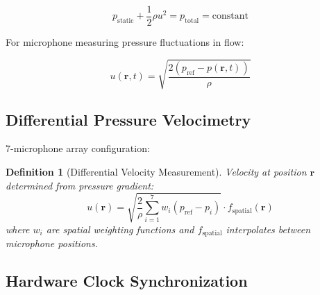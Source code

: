 \documentclass[12pt,a4paper]{article}
\newtheorem{definition}{Definition}
\begin{document}
\begin{equation}
p_{\text{static}} + \frac{1}{2}\rho u^2 = p_{\text{total}} = \text{constant}
\end{equation}

For microphone measuring pressure fluctuations in flow:

\begin{equation}
u(\mathbf{r}, t) = \sqrt{\frac{2(p_{\text{ref}} - p(\mathbf{r}, t))}{\rho}}
\end{equation}

\subsection{Differential Pressure Velocimetry}

7-microphone array configuration:

\begin{center}
\end{center}

\begin{definition}[Differential Velocity Measurement]
Velocity at position $\mathbf{r}$ determined from pressure gradient:
\begin{equation}
u(\mathbf{r}) = \sqrt{\frac{2}{\rho} \sum_{i=1}^{7} w_i(p_{\text{ref}} - p_i)} \cdot f_{\text{spatial}}(\mathbf{r})
\end{equation}
where $w_i$ are spatial weighting functions and $f_{\text{spatial}}$ interpolates between microphone positions.
\end{definition}

\subsection{Hardware Clock Synchronization}
\end{document}
